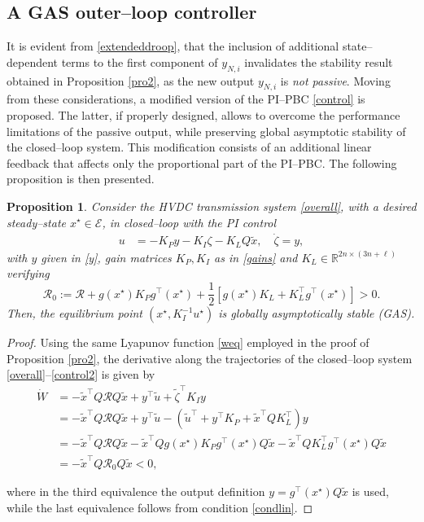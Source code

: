 \documentclass[5p,twocolumn]{elsarticle}
\def\lab{\label}
\newtheorem{proposition}[theorem]{Proposition}
\numberwithin{equation}{section}
\begin{document}
\subsection{A GAS outer--loop controller}
It is evident from \eqref{extendeddroop}, that the inclusion of additional state--dependent terms to the first component of $y_{N,i}$ invalidates the stability result obtained in Proposition \ref{pro2}, as the new output $y_{N,i}$ is {\em not passive}. Moving from these considerations, a modified version of the PI--PBC \eqref{control} is proposed. The latter, if properly designed, allows to overcome the performance  limitations of the passive output, while preserving global asymptotic stability of the closed--loop system. This modification consists of an additional linear feedback that affects only the proportional part of the PI--PBC.  The following  proposition is then presented.\\
\begin{proposition}\em
\lab{prolast}
Consider the HVDC transmission system \eqref{overall}, with a desired steady--state $x^\star  \in\mathcal{E}$, in closed--loop with the PI control
\begin{equation}\label{control2}
\begin{aligned}
u & = -K_P y - K_I\zeta-K_L Q\tilde x,\quad \dot \zeta = y,
\end{aligned}
\end{equation}
with $y$ given in \eqref{y}, gain matrices $K_P, K_I$ as in \eqref{gains} and \mbox{$K_L\in\mathbb{R}^{2n\times(3n+\ell)}$} verifying
\begin{equation}\label{condlin}
\mathcal{R}_0:=\mathcal{R}+g(x^\star) K_Pg^\top(x^\star)+\frac{1}{2}\left[g(x^\star)K_L+K_L^\top g^\top(x^\star)\right]>0.
\end{equation}
 Then, the equilibrium point $(x^\star ,K_I^{-1}u^\star )$ is globally asymptotically stable (GAS).
\end{proposition}
\begin{proof}
Using the same Lyapunov function \eqref{weq} employed in the proof of Proposition \ref{pro2}, the derivative along the trajectories of the closed--loop system \eqref{overall}--\eqref{control2} is given by
\begin{equation*}
\begin{aligned}
\dot{{W}}&=-\tilde x^\top Q\mathcal{R}Q\tilde x+{y}^\top\tilde{u}+\tilde\zeta^\top K_Iy\\
&=-\tilde x^\top Q\mathcal{R}Q\tilde x+{y}^\top\tilde{u}-(\tilde u^\top +y^\top K_P+\tilde x^\top QK_L^\top)y  \\
&=-\tilde x^\top Q\mathcal{R}Q\tilde x-\tilde x^\top Qg(x^\star)K_Pg^\top(x^\star)Q\tilde x-\tilde x^\top QK_L^\top g^\top(x^\star)Q\tilde x\\
& = -\tilde x^\top Q\mathcal{R}_0Q\tilde x<0
,
\end{aligned}
\end{equation*}

where in the third equivalence the output definition \mbox{$y=g^\top(x^\star)Q\tilde x$} is used, while the last equivalence follows from condition \eqref{condlin}.
\end{proof}
\smallbreak
\end{document}
